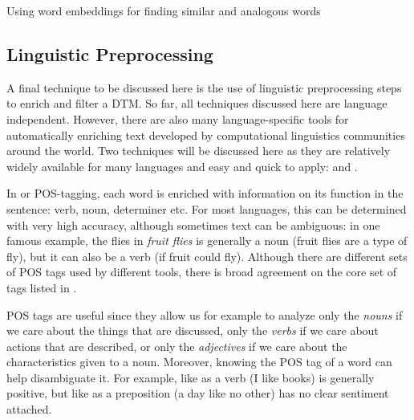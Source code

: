 \begin{ccsexample}
\caption{Using word embeddings for finding similar and analogous words}\label{ex:embedding}
\end{ccsexample}





\subsection{Linguistic Preprocessing}
\label{sec:nlp}

A final technique to be discussed here is the use of linguistic preprocessing steps to enrich and filter a DTM.
So far, all techniques discussed here are language independent.
However, there are also many language-specific tools for automatically enriching text developed by computational linguistics communities around the world.
Two techniques will be discussed here as they are relatively widely available for many languages and easy and quick to apply:  and .

In  or POS-tagging, each word is enriched with information on its function in the sentence: verb, noun, determiner etc.
For most languages, this can be determined with very high accuracy, although sometimes text can be ambiguous:
in one famous example, the flies in \emph{fruit flies} is generally a noun (fruit flies are a type of fly), but it can also be a verb (if fruit could fly). 
Although there are different sets of POS tags used by different tools, there is broad agreement on the core set of tags listed in .



POS tags are useful since they allow us for example to analyze only the \textit{nouns} if we care about the things that are discussed, only the \textit{verbs} if we care about actions that are described, or only the \textit{adjectives} if we care about the characteristics given to a noun.
Moreover, knowing the POS tag of a word can help disambiguate it.
For example, like as a verb (I like books) is generally positive, but like as a preposition (a day like no other) has no clear sentiment attached.

